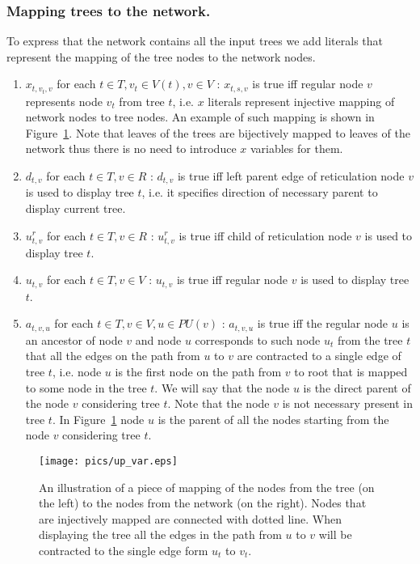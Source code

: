 \documentclass[runningheads, envcountsame, a4paper]{llncs}
\begin{document}
\subsubsection{Mapping trees to the network.}

To express that the network contains all the input trees we add literals that represent the mapping of the tree nodes to 
the network nodes.

\begin{enumerate}

\item $x_{t,v_t,v}$ for each $t \in T, v_t \in V(t), v \in V$ :
$x_{t,s,v}$ is true iff regular node $v$ represents node $v_t$ from tree $t$, i.e. $x$ literals represent injective 
mapping of network nodes to tree nodes. An example of such mapping is shown in Figure~\ref{mapping-example}.
Note that leaves of the trees are bijectively mapped to leaves of the network thus there is no need to introduce $x$ variables for them.

\item $d_{t,v}$ for each $t \in T, v \in R$ :
$d_{t,v}$ is true iff left parent edge of reticulation node $v$ is used to display tree $t$,
 i.e. it specifies direction of necessary parent to display current tree.

\item $u^r_{t,v}$ for each $t \in T, v \in R$ :
$u^r_{t,v}$ is true iff child of reticulation node $v$ is used to display tree $t$.

\item $u_{t,v}$ for each $t \in T, v \in V$ :
$u_{t,v}$ is true iff regular node $v$ is used to display tree $t$.

\item $a_{t,v,u}$ for each $t \in T, v \in V, u \in PU(v)$ :
$a_{t,v,u}$ is true iff the regular node $u$ is an ancestor of node $v$ and node $u$ corresponds to such node $u_t$ 
from the tree $t$ that all the edges on the path from $u$ to $v$ are contracted to a single edge of tree $t$, i.e. node
$u$ is the first node on the path from $v$ to root that is mapped to some node in the tree $t$.
We will say that the node $u$ is the direct parent of the node $v$ considering tree $t$. Note that the node $v$ is not necessary present in tree $t$.
In Figure~\ref{mapping-example} node $u$ is the parent of all the nodes starting from the node $v$ considering tree $t$.

\end{enumerate}

\begin{figure}[t]
  \centering
  \texttt{[image: pics/up\_var.eps]}
  \caption{An illustration of a piece of mapping of the nodes from the tree (on the left) to the nodes from the network (on the right). 
  Nodes that are injectively mapped are connected with dotted line. When displaying the tree all the edges in the path from $u$ to $v$
  will be contracted to the single edge form $u_t$ to $v_t$.}
  \label{mapping-example}
\end{figure}
\end{document}
